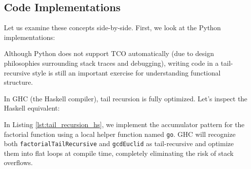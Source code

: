 \subsection{Code Implementations}

Let us examine these concepts side-by-side. First, we look at the Python implementations:



Although Python does not support TCO automatically (due to design philosophies surrounding stack traces and debugging), writing code in a tail-recursive style is still an important exercise for understanding functional structure. 

In GHC (the Haskell compiler), tail recursion is fully optimized. Let's inspect the Haskell equivalent:



In Listing \ref{lst:tail_recursion_hs}, we implement the accumulator pattern for the factorial function using a local helper function named \texttt{go}. GHC will recognize both \texttt{factorialTailRecursive} and \texttt{gcdEuclid} as tail-recursive and optimize them into flat loops at compile time, completely eliminating the risk of stack overflows.
